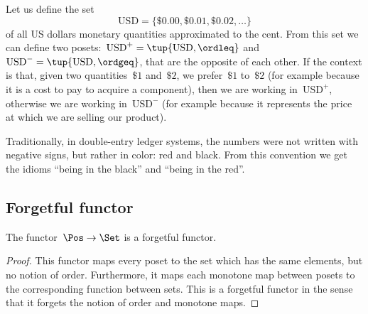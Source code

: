 \begin{example}
   Let us define the set
   \begin{equation*}
       \text{USD}=\{\$0.00,\$0.01,\$0.02,\dots\}
   \end{equation*}
   of all US dollars monetary quantities approximated to the cent.
   From this set we can define two posets:~$\text{USD}^{+} = \tup{\text{USD}, \ordleq}$ and~$\text{USD}^{-} = \tup{\text{USD}, \ordgeq}$, that are the opposite of each other.
   If the context is that, given two quantities~$\$1$ and~$\$2$, we prefer~$\$1$ to~$\$2$ (for example because it is a cost to pay to acquire a component), then we are working in~$\text{USD}^{+}$,
   otherwise we are working in~$\text{USD}^{-}$ (for example because it represents the price at which we are selling our product).

   Traditionally, in double-entry ledger systems, the numbers were not written with negative signs, but rather in color: red and black. From this convention we get the idioms ``being in the black'' and ``being in the red''.
\end{example}

\subsection{Forgetful functor}
\begin{lemma}
The functor~$\Pos \to \Set$ is a forgetful functor.
\end{lemma}
\begin{proof}
This functor maps every poset to the set which has the same elements, but no notion of order. Furthermore, it maps each monotone map between posets to the corresponding function between sets. This is a forgetful functor in the sense that it forgets the notion of order and monotone maps.
\end{proof}



